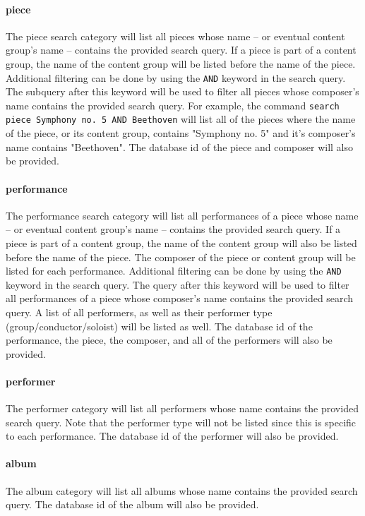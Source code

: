 \paragraph{piece}
The piece search category will list all pieces whose name -- or eventual content group's name -- contains the provided search query.
If a piece is part of a content group, the name of the content group will be listed before the name of the piece.
Additional filtering can be done by using the \texttt{AND} keyword in the search query.
The subquery after this keyword will be used to filter all pieces whose composer's name contains the provided search query.
For example, the command \texttt{search piece Symphony no. 5 AND Beethoven} will list all of the pieces
where the name of the piece, or its content group, contains "Symphony no. 5" and it's composer's name
contains "Beethoven".
The database id of the piece and composer will also be provided.

\paragraph{performance}
The performance search category will list all performances of a piece whose name -- or eventual content group's name -- contains the provided search query.
If a piece is part of a content group, the name of the content group will also be listed before the name of the piece.
The composer of the piece or content group will be listed for each performance.
Additional filtering can be done by using the \texttt{AND} keyword in the search query.
The query after this keyword will be used to filter all performances of a piece whose composer's name contains the provided search query.
A list of all performers, as well as their performer type (group/conductor/soloist) will be listed as well.
The database id of the performance, the piece, the composer, and all of the performers will also be provided.

\paragraph{performer}
The performer category will list all performers whose name contains the provided search query.
Note that the performer type will not be listed since this is specific to each performance.
The database id of the performer will also be provided.

\paragraph{album}
The album category will list all albums whose name contains the provided search query.
The database id of the album will also be provided.

